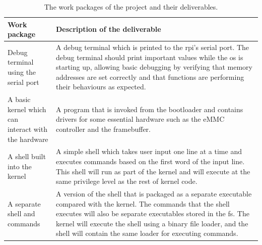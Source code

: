 \documentclass{article}
\begin{document}
\begin{table}[tbp]
\begin{center}
\begin{tabularx}{\textwidth}{|p{}|X|}
    \hline
    \textbf{Work package} & \textbf{Description of the deliverable}
    \\ \hline
    \makecell[lt]{Debug terminal using the \\ serial port} &
    A debug terminal which is printed to the \gls{rpi}'s serial port. The debug
    terminal should print important values while the \gls{os} is starting up,
    allowing basic debugging by verifying that memory addresses are set
    correctly and that functions are performing their behaviours as expected.
    \\ \hline
    \makecell[lt]{A basic kernel which can \\ interact with the hardware} &
    A program that is invoked from the bootloader and contains drivers for some
    essential hardware such as the eMMC controller and the framebuffer.
    \\ \hline
    \makecell[lt]{A shell built into the \\ kernel} &
    A simple shell which takes user input one line at a time and executes
    commands based on the first word of the input line. This shell will run as
    part of the kernel and will execute at the same privilege level as the rest
    of kernel code.
    \\ \hline
    \makecell[lt]{A separate shell and \\ commands} &
    A version of the shell that is packaged as a separate executable compared
    with the kernel. The commands that the shell executes will also be separate
    executables stored in the \gls{fs}. The kernel will execute the shell using
    a binary file loader, and the shell will contain the same loader for
    executing commands.
    \\ \hline
\end{tabularx}
\caption{The work packages of the project and their deliverables.}
\label{tab:work-packages}
\end{center}
\end{table}
\end{document}
